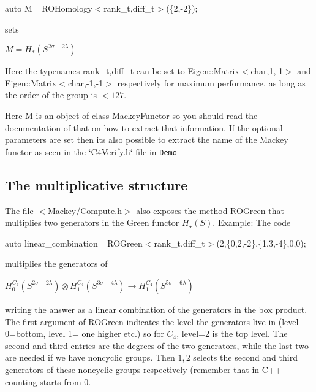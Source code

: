 {\ttfamily  auto M= R\+O\+Homology$<$rank\+\_\+t,diff\+\_\+t$>$(\{2,-\/2\}); }

sets

$ M=H_*(S^{2\sigma-2\lambda})$

Here the typenames {\ttfamily rank\+\_\+t,diff\+\_\+t} can be set to {\ttfamily Eigen\+::\+Matrix$<$char,1,-\/1$>$} and {\ttfamily Eigen\+::\+Matrix$<$char,-\/1,-\/1$>$} respectively for maximum performance, as long as the order of the group is $ <127 $.

Here {\ttfamily M} is an object of class \hyperlink{classMackey_1_1MackeyFunctor}{Mackey\+Functor} so you should read the documentation of that on how to extract that information. If the optional parameters are set then it\textquotesingle{}s also possible to extract the name of the \hyperlink{namespaceMackey}{Mackey} functor as seen in the \char`\"{}\+C4\+Verify.\+h\char`\"{} file in \href{https://github.com/NickG-Math/Mackey/Demo}{\tt Demo}\hypertarget{use_step1mult}{}\subsection{The multiplicative structure}\label{use_step1mult}
The file {\ttfamily $<$\hyperlink{Compute_8h}{Mackey/\+Compute.\+h}$>$} also exposes the method \hyperlink{namespaceMackey_a2bd86833844ca62d76c47a54aeb0bb77}{R\+O\+Green} that multiplies two generators in the Green functor $H_{\star}(S)$. Example\+: The code

{\ttfamily auto linear\+\_\+combination= R\+O\+Green$<$rank\+\_\+t,diff\+\_\+t$>$(2,\{0,2,-\/2\},\{1,3,-\/4\},0,0);}

multiplies the generators of

$ H_0^{C_4}(S^{2\sigma-2\lambda}) \otimes H_1^{C_4}(S^{3\sigma-4\lambda}) \to H_1^{C_4}(S^{5\sigma-6\lambda}) $

writing the answer as a linear combination of the generators in the box product. The first argument of \hyperlink{namespaceMackey_a2bd86833844ca62d76c47a54aeb0bb77}{R\+O\+Green} indicates the level the generators live in (level 0=bottom, level 1= one higher etc.) so for $C_4$, level=2 is the top level. The second and third entries are the degrees of the two generators, while the last two are needed if we have noncyclic groups. Then $1,2$ selects the second and third generators of these noncyclic groups respectively (remember that in C++ counting starts from $0$.

